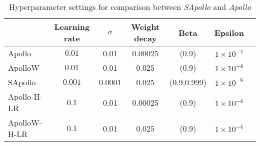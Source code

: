 \begin{table}[h!]
    \centering
    \caption{Hyperparameter settings for comparison between \emph{SApollo} and \emph{Apollo}}
    \label{tab:sapollo-comp-params}
    \begin{tabular}{lcccccc}  %
        \toprule
        & \textbf{Learning rate} &$\sigma$& \textbf{Weight decay} & \textbf{Beta} & \textbf{Epsilon} \\
        \midrule

        Apollo      & $0.01$   &0.01& 0.00025  & (0.9)  & $1 \times 10 ^{-4} $  \\
        ApolloW      & $0.01$   &0.01& 0.025  & (0.9)  & $1 \times 10 ^{-4} $  \\
        SApollo      &$0.001$ &0.0001& 0.025   & (0.9,0.999)  & $1 \times 10 ^{-8} $  \\
        Apollo-H-LR      & $0.1$   &0.01& 0.00025  & (0.9)  & $1 \times 10 ^{-4} $  \\
        ApolloW-H-LR    & $0.1$   &0.01& 0.025  & (0.9)  & $1 \times 10 ^{-4} $  \\
        \bottomrule
    \end{tabular}
\end{table}



